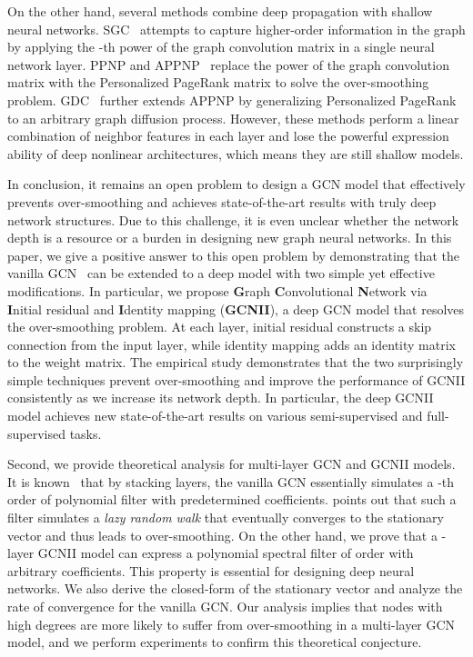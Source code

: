 \documentclass{article}
\begin{document}
On the other hand, several methods combine deep propagation with shallow neural networks.
SGC~\cite{pmlr-v97-wu19e}  attempts to
capture higher-order information in the graph by applying the -th
power of the graph
convolution matrix in a single neural network layer.
PPNP and APPNP~\cite{klicpera_predict_2019} replace the power of
the graph convolution matrix with the Personalized PageRank matrix to
solve the over-smoothing
problem. GDC~\cite{DBLP:conf/nips/KlicperaWG19} further extends APPNP
by generalizing Personalized PageRank~\cite{page1999pagerank}
to an arbitrary graph diffusion process. However, these methods perform a linear
combination of neighbor features in each layer and lose the powerful
expression ability of deep nonlinear architectures,  which means they
are still shallow models.

In conclusion, it remains an open problem to
design a GCN model that effectively
prevents over-smoothing and achieves state-of-the-art results
with  truly deep network structures. 
Due to this challenge, it is even unclear whether the network depth is a
resource or a burden in designing new graph neural networks. 
In this paper, we give a positive answer to this open problem by demonstrating that the vanilla GCN~\cite{DBLP:conf/iclr/KipfW17} 
can be extended to a deep model with two simple yet effective modifications. In
particular, we propose \textbf{G}raph \textbf{C}onvolutional \textbf{N}etwork via
\textbf{I}nitial residual and \textbf{I}dentity mapping ({\bf GCNII}), a deep GCN model that resolves the over-smoothing problem.
At each layer, initial
residual constructs a skip connection from the input
layer, while identity mapping adds an identity matrix
to the weight matrix.
The empirical study demonstrates that the two surprisingly simple
techniques prevent over-smoothing and improve the performance of GCNII
consistently as we increase its
network depth. In
particular, the deep GCNII model  achieves new state-of-the-art results on
various semi-supervised and full-supervised tasks.


Second, we provide theoretical analysis for multi-layer GCN and
GCNII models.  It
is known~\cite{pmlr-v97-wu19e}   that by stacking  layers, the vanilla GCN essentially simulates a
-th order of polynomial filter with predetermined
coefficients. \cite{wang2019improving} points out that such a filter
simulates a {\em lazy random walk}  that eventually
converges to the stationary vector and thus leads to
over-smoothing. 
On the other hand, we prove that  a -layer GCNII model can express a
polynomial spectral filter of order  with arbitrary
coefficients. This property is essential for designing deep neural
networks. We also derive the closed-form of the
stationary vector and analyze the rate of convergence for the vanilla
GCN. Our analysis implies that nodes with high degrees are
more likely to suffer from over-smoothing  in a multi-layer GCN model, and we perform experiments
to confirm this theoretical conjecture.
\end{document}
